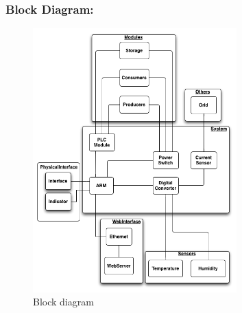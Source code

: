 \subsubsection{Block Diagram:}
	\begin{figure}[H]
		\begin{centering}
			 \includegraphics[width=0.7\textwidth]{images/block_diagram.png}
			\caption{Block diagram}
	 	\end{centering}
	\end{figure}
